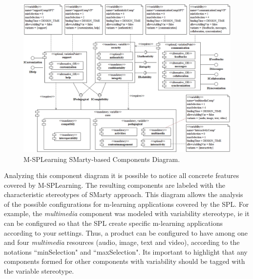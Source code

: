 \begin{figure}[!ht]
\centering
\includegraphics[scale=0.46]{figures/section3/MSPLDesign}
\caption{M-SPLearning SMarty-based Components Diagram.}
\label{figureMSPLDesign}
\end{figure}

Analyzing this component diagram it is possible to notice all concrete features covered by M-SPLearning. The resulting components are labeled with the characteristic stereotypes of SMarty approach. This diagram allows the analysis of the possible configurations for m-learning applications covered by the SPL.
For example, the \textit{multimedia} component was modeled with variability stereotype, ie it can be configured so that the SPL create specific m-learning applications according to your settings. Thus, a product can be configured to have among one and four \textit{multimedia} resources (audio, image, text and video), according to the notations ``minSelection" and ``maxSelection". Its important to highlight that any components formed for other components with variability should be tagged with the variable stereotype.

